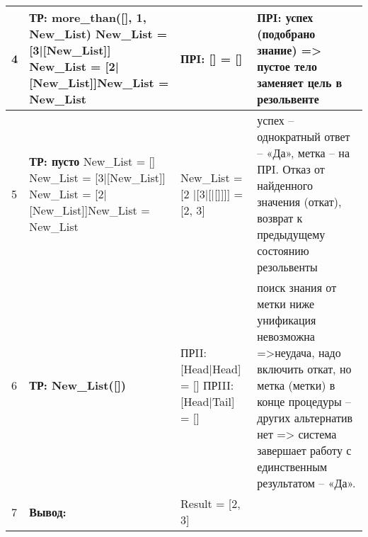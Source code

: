 \begin{table}[h!]
\begin{tabular}{|p{1.2cm}|p{5cm}|p{4cm}|p{6cm}|}
		4 & \textbf{ТР: more\_than([], 1, New\_List)} \newline New\_List = [3|[New\_List]] \newline New\_List = [2|[New\_List]]\newline New\_List = New\_List & ПРI: [] = [] & ПРI: успех (подобрано знание) => пустое тело заменяет цель в резольвенте \\
		\hline
		5 & \textbf{ТР: пусто}  \newline New\_List = []  \newline New\_List = [3|[New\_List]] \newline New\_List = [2|[New\_List]]\newline New\_List = New\_List
		 & New\_List = [2 |[3|[|[]]]] = [2, 3] & успех – однократный ответ – «Да», метка – на ПРI.
		 Отказ от найденного значения (откат), возврат к предыдущему состоянию резольвенты \\
		\hline
		6 & \textbf{ТР: New\_List([])}  & ПРII: [Head|Head] = [] ПРIII: [Head|Tail] = []  & поиск знания от метки ниже \newline унификация невозможна =>неудача, надо включить откат, но 
		метка (метки) в конце процедуры – других альтернатив нет => система завершает работу с единственным результатом – «Да».
		 \\
		\hline
		7 & \textbf{Вывод:} &Result = [2, 3] &  \\
		\hline
	\end{tabular}
\end{table}


